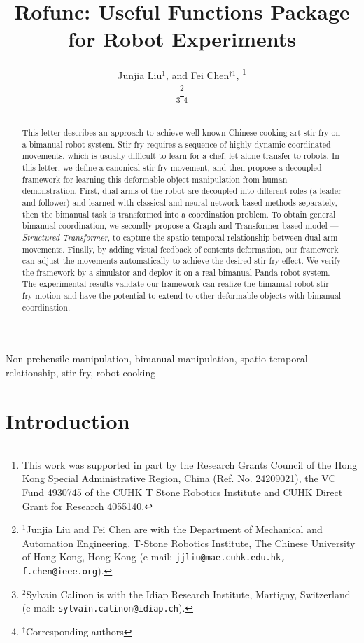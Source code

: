 \documentclass[letterpaper, 10 pt, conference]{IEEEtran}
\title{\LARGE \bf
	Rofunc: Useful Functions Package for Robot Experiments
}
\author{Junjia Liu$^{1}$, \IEEEmembership{Student Member, IEEE}  and Fei Chen$^{\dagger 1}$, \IEEEmembership{Senior Member, IEEE}%
	\thanks{This work was supported in part by the Research Grants Council of the Hong Kong Special Administrative Region, China (Ref. No. 24209021), the VC Fund 4930745 of the CUHK T Stone Robotics Institute and CUHK Direct Grant for Research 4055140.}%
	
	\thanks{$^{1}$Junjia Liu and Fei Chen are with the Department of Mechanical and Automation Engineering, T-Stone Robotics Institute, The Chinese University of Hong Kong, Hong Kong (e-mail: {\tt\small jjliu@mae.cuhk.edu.hk, f.chen@ieee.org}).}%
	
	\thanks{$^{2}$Sylvain Calinon is with the Idiap Research Institute, Martigny, Switzerland  (e-mail: {\tt\small sylvain.calinon@idiap.ch}).}%
	\thanks{$^\dagger$Corresponding authors}
}
\begin{document}
	\maketitle
	\thispagestyle{empty}
	\pagestyle{empty}
	
	\begin{abstract}   
		This letter describes an approach to achieve well-known Chinese cooking art stir-fry on a bimanual robot system. Stir-fry requires a sequence of highly dynamic coordinated movements, which is usually difficult to learn for a chef, let alone transfer to robots. In this letter, we define a canonical stir-fry movement, and then propose a decoupled framework for learning this deformable object manipulation from human demonstration. First, dual arms of the robot are decoupled into different roles (a leader and follower) and learned with classical and neural network based methods separately, then the bimanual task is transformed into a coordination problem. To obtain general bimanual coordination, we secondly propose a Graph and Transformer based model --- \textit{Structured-Transformer}, to capture the spatio-temporal relationship between dual-arm movements. Finally, by adding visual feedback of contents deformation, our framework can adjust the movements automatically to achieve the desired stir-fry effect. We verify the framework by a simulator and deploy it on a real bimanual Panda robot system. The experimental results validate our framework can realize the bimanual robot stir-fry motion and have the potential to extend to other deformable objects with bimanual coordination.
	\end{abstract}
	
	\begin{IEEEkeywords}
		Non-prehensile manipulation, bimanual manipulation,
		spatio-temporal relationship, stir-fry, robot cooking
	\end{IEEEkeywords}
	
	\section{Introduction}

	
	
%	
%	
	
\end{document}
